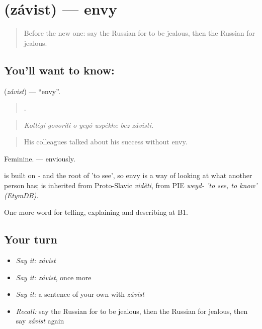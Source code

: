 \section[\texorpdfstring{\ru{зависть} (závist)}{зависть (závist)}]{ (závist) — envy}

\label{lesson:RU-C469-zavist}



\begin{quote}
Before the new one: say the Russian for to be jealous, then the Russian for jealous.
\end{quote}

\subsection*{You'll want to know: }
\textbf{} (\emph{závist}) — \textquotedblleft{}envy\textquotedblright{}.

\begin{quote}
      .
\end{quote}

\begin{quote}
\emph{Kollégi govoríli o yegó uspékhe bez závisti.}
\end{quote}

\begin{quote}
His colleagues talked about his success without envy.
\end{quote}

Feminine. \emph{ } — enviously.

\begin{cousinweb}
\emph{} is built on \emph{-} and the root of \emph{} 'to see', so envy is a way of looking at what another person has; \emph{} is inherited from Proto-Slavic \emph{viděti}, from PIE \emph{weyd- 'to see, to know' (EtymDB).}
\end{cousinweb}

\begin{grammarlens}[title={What you've built}]
One more word for telling, explaining and describing at B1.
\end{grammarlens}

\subsection*{Your turn}
\begin{itemize}
\raggedright
  \item \emph{Say it:} \emph{závist}
  \item \emph{Say it:} \emph{závist}, once more
  \item \emph{Say it:} a sentence of your own with \emph{závist}
  \item \emph{Recall:} say the Russian for to be jealous, then the Russian for jealous, then say \emph{závist} again
\end{itemize}

